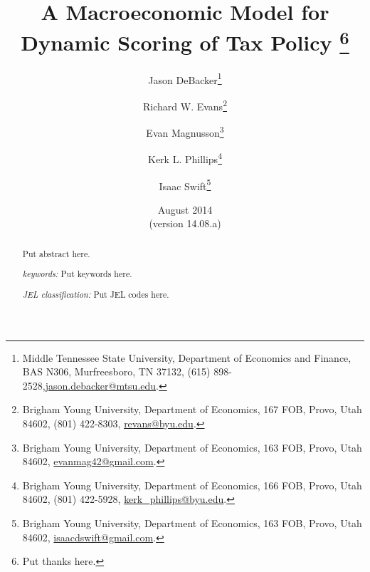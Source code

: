 \documentclass[letterpaper,12pt]{article}
\theoremstyle{definition}
\begin{document}
\begin{titlepage}
\title{A Macroeconomic Model for \\
       Dynamic Scoring of Tax Policy
       \thanks{
       Put thanks here.}
       }
\author{
  Jason DeBacker\footnote{Middle Tennessee State University, Department of Economics and Finance, BAS N306, Murfreesboro, TN 37132, (615) 898-2528,\href{mailto:jason.debacker@mtsu.edu}{jason.debacker@mtsu.edu}.} \\[-2pt]
  \and
  Richard W. Evans\footnote{Brigham Young University, Department of Economics, 167 FOB, Provo, Utah 84602, (801) 422-8303, \href{mailto:revans@byu.edu}{revans@byu.edu}.} \\[-2pt]
  \and
  Evan Magnusson\footnote{Brigham Young University, Department of Economics, 163 FOB, Provo, Utah 84602, \href{mailto:evanmag42@gmail.com}{evanmag42@gmail.com}.} \\[-2pt]
  \and
  Kerk L. Phillips\footnote{Brigham Young University, Department of Economics, 166 FOB, Provo, Utah 84602, (801) 422-5928, \href{mailto:kerk_phillips@byu.edu}{kerk\_phillips@byu.edu}.} \\[-2pt]
  \and
  Isaac Swift\footnote{Brigham Young University, Department of Economics, 163 FOB, Provo, Utah 84602, \href{mailto:isaacdswift@gmail.com}{isaacdswift@gmail.com}.} \\[-2pt]}
\date{August 2014 \\
  \scriptsize{(version 14.08.a)}}
\maketitle
\begin{abstract}
\normalsize{Put abstract here.

\vspace{3mm}

\noindent\textit{keywords:}\: Put keywords here.

\vspace{3mm}

\noindent\textit{JEL classification:} Put JEL codes here.}
\end{abstract}
\thispagestyle{empty}
\end{titlepage}
\end{document}
